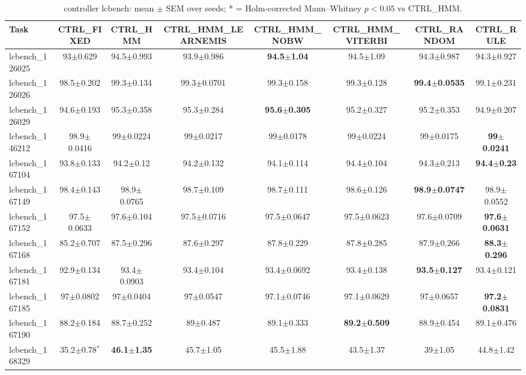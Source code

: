 \begin{table}[t]
\caption{controller lcbench: mean $\pm$ SEM over seeds; * = Holm-corrected Mann--Whitney $p<0.05$ vs CTRL_HMM.}
\label{tab:controller_lcbench}
\begin{center}\small
\begin{tabular}{lccccccc}
\hline
Task & CTRL\_FIXED & CTRL\_HMM & CTRL\_HMM\_LEARNEMIS & CTRL\_HMM\_NOBW & CTRL\_HMM\_VITERBI & CTRL\_RANDOM & CTRL\_RULE \\
\hline
lcbench\_126025 & 93$\pm$0.629 & 94.5$\pm$0.993 & 93.9$\pm$0.986 & \textbf{94.5$\pm$1.04} & 94.5$\pm$1.09 & 94.3$\pm$0.987 & 94.3$\pm$0.927 \\
lcbench\_126026 & 98.5$\pm$0.202 & 99.3$\pm$0.134 & 99.3$\pm$0.0701 & 99.3$\pm$0.158 & 99.3$\pm$0.128 & \textbf{99.4$\pm$0.0535} & 99.1$\pm$0.231 \\
lcbench\_126029 & 94.6$\pm$0.193 & 95.3$\pm$0.358 & 95.3$\pm$0.284 & \textbf{95.6$\pm$0.305} & 95.2$\pm$0.327 & 95.2$\pm$0.353 & 94.9$\pm$0.207 \\
lcbench\_146212 & 98.9$\pm$0.0416 & 99$\pm$0.0224 & 99$\pm$0.0217 & 99$\pm$0.0178 & 99$\pm$0.0224 & 99$\pm$0.0175 & \textbf{99$\pm$0.0241} \\
lcbench\_167104 & 93.8$\pm$0.133 & 94.2$\pm$0.12 & 94.2$\pm$0.132 & 94.1$\pm$0.114 & 94.4$\pm$0.104 & 94.3$\pm$0.213 & \textbf{94.4$\pm$0.23} \\
lcbench\_167149 & 98.4$\pm$0.143 & 98.9$\pm$0.0765 & 98.7$\pm$0.109 & 98.7$\pm$0.111 & 98.6$\pm$0.126 & \textbf{98.9$\pm$0.0747} & 98.9$\pm$0.0552 \\
lcbench\_167152 & 97.5$\pm$0.0633 & 97.6$\pm$0.104 & 97.5$\pm$0.0716 & 97.5$\pm$0.0647 & 97.5$\pm$0.0623 & 97.6$\pm$0.0709 & \textbf{97.6$\pm$0.0631} \\
lcbench\_167168 & 85.2$\pm$0.707 & 87.5$\pm$0.296 & 87.6$\pm$0.297 & 87.8$\pm$0.229 & 87.8$\pm$0.285 & 87.9$\pm$0.266 & \textbf{88.3$\pm$0.296} \\
lcbench\_167181 & 92.9$\pm$0.134 & 93.4$\pm$0.0903 & 93.4$\pm$0.104 & 93.4$\pm$0.0692 & 93.4$\pm$0.138 & \textbf{93.5$\pm$0.127} & 93.4$\pm$0.121 \\
lcbench\_167185 & 97$\pm$0.0802 & 97$\pm$0.0404 & 97$\pm$0.0547 & 97.1$\pm$0.0746 & 97.1$\pm$0.0629 & 97$\pm$0.0657 & \textbf{97.2$\pm$0.0831} \\
lcbench\_167190 & 88.2$\pm$0.184 & 88.7$\pm$0.252 & 89$\pm$0.487 & 89.1$\pm$0.333 & \textbf{89.2$\pm$0.509} & 88.9$\pm$0.454 & 89.1$\pm$0.476 \\
lcbench\_168329 & 35.2$\pm$0.78$^{*}$ & \textbf{46.1$\pm$1.35} & 45.7$\pm$1.05 & 45.5$\pm$1.88 & 43.5$\pm$1.37 & 39$\pm$1.05 & 44.8$\pm$1.42 \\

\end{tabular}
\end{center}
\end{table}
